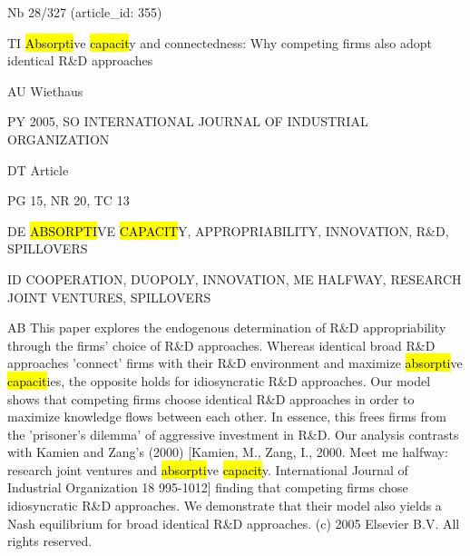 \documentclass[a4paper]{article}
\begin{document}
\vspace*{-2cm}
Nb \tabto{0cm}28/327 (article\_id: 355)\par
TI \tabto{0cm}\hl{Absorpti}ve \hl{capacit}y and connectedness: Why competing firms also adopt identical R\&D approaches\par
AU \tabto{0cm}Wiethaus\par
PY \tabto{0cm}2005, SO INTERNATIONAL JOURNAL OF INDUSTRIAL ORGANIZATION\par
DT \tabto{0cm}Article\par
PG \tabto{0cm}15, NR 20, TC 13\par
DE \tabto{0cm}\hl{ABSORPTI}VE \hl{CAPACIT}Y, APPROPRIABILITY, INNOVATION, R\&D, SPILLOVERS\par
ID \tabto{0cm}COOPERATION, DUOPOLY, INNOVATION, ME HALFWAY, RESEARCH JOINT VENTURES, SPILLOVERS\par
AB \tabto{0cm}This paper explores the endogenous determination of R\&D appropriability through the firms' choice of R\&D approaches. Whereas identical broad R\&D approaches 'connect' firms with their R\&D environment and maximize \hl{absorpti}ve \hl{capacit}ies, the opposite holds for idiosyncratic R\&D approaches. Our model shows that competing firms choose identical R\&D approaches in order to maximize knowledge flows between each other. In essence, this frees firms from the 'prisoner's dilemma' of aggressive investment in R\&D. Our analysis contrasts with Kamien and Zang's (2000) [Kamien, M., Zang, I., 2000. Meet me halfway: research joint ventures and \hl{absorpti}ve \hl{capacit}y. International Journal of Industrial Organization 18 995-1012] finding that competing firms chose idiosyncratic R\&D approaches. We demonstrate that their model also yields a Nash equilibrium for broad identical R\&D approaches. (c) 2005 Elsevier B.V. All rights reserved.\par
\clearpage
\end{document}
